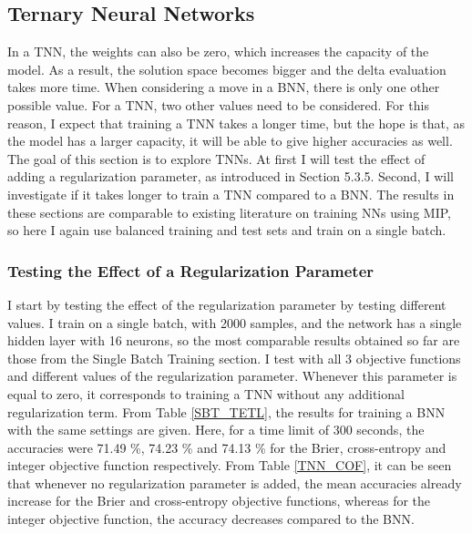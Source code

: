 


\subsection{Ternary Neural Networks}
\noindent In a TNN, the weights can also be zero, which increases the capacity of the model. As a result, the solution space becomes bigger and the delta evaluation takes more time. When considering a move in a BNN, there is only one other possible value. For a TNN, two other values need to be considered. For this reason, I expect that training a TNN takes a longer time, but the hope is that, as the model has a larger capacity, it will be able to give higher accuracies as well. The goal of this section is to explore TNNs. At first I will test the effect of adding a regularization parameter, as introduced in Section 5.3.5. Second, I will investigate if it takes longer to train a TNN compared to a BNN. The results in these sections are comparable to existing literature on training NNs using MIP, so here I again use balanced training and test sets and train on a single batch.



\subsubsection{Testing the Effect of a Regularization Parameter}
I start by testing the effect of the regularization parameter by testing different values. I train on a single batch, with 2000 samples, and the network has a single hidden layer with 16 neurons, so the most comparable results obtained so far are those from the Single Batch Training section. I test with all 3 objective functions and different values of the regularization parameter. Whenever this parameter is equal to zero, it corresponds to training a TNN without any additional regularization term. From Table \ref{SBT_TETL}, the results for training a BNN with the same settings are given. Here, for a time limit of 300 seconds, the accuracies were 71.49 \%, 74.23 \% and 74.13 \% for the Brier, cross-entropy and integer objective function respectively. From Table \ref{TNN_COF}, it can be seen that whenever no regularization parameter is added, the mean accuracies already increase for the Brier and cross-entropy objective functions, whereas for the integer objective function, the accuracy decreases compared to the BNN. \\

